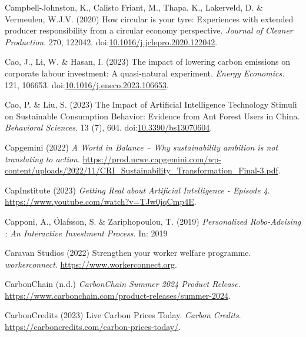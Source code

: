 \documentclass[
  letterpaper,
  DIV=11,
  numbers=noendperiod]{scrartcl}
\newlength{\cslhangindent}
\newenvironment{CSLReferences}[2] %
 {\begin{list}{}{%
  \setlength{\itemindent}{0pt}
  \setlength{\leftmargin}{0pt}
  \setlength{\parsep}{0pt}
  \ifodd #1
   \setlength{\leftmargin}{\cslhangindent}
   \setlength{\itemindent}{-1\cslhangindent}
  \fi
  \setlength{\itemsep}{#2\baselineskip}}}
 {\end{list}}
\begin{document}
\begin{CSLReferences}{0}{1}
Campbell-Johnston, K., Calisto Friant, M., Thapa, K., Lakerveld, D. \&
Vermeulen, W.J.V. (2020) How circular is your tyre: {Experiences} with
extended producer responsibility from a circular economy perspective.
\emph{Journal of Cleaner Production}. 270, 122042.
doi:\href{https://doi.org/10.1016/j.jclepro.2020.122042}{10.1016/j.jclepro.2020.122042}.

Cao, J., Li, W. \& Hasan, I. (2023) The impact of lowering carbon
emissions on corporate labour investment: {A} quasi-natural experiment.
\emph{Energy Economics}. 121, 106653.
doi:\href{https://doi.org/10.1016/j.eneco.2023.106653}{10.1016/j.eneco.2023.106653}.

Cao, P. \& Liu, S. (2023) The {Impact} of {Artificial Intelligence
Technology Stimuli} on {Sustainable Consumption Behavior}: {Evidence}
from {Ant Forest Users} in {China}. \emph{Behavioral Sciences}. 13 (7),
604. doi:\href{https://doi.org/10.3390/bs13070604}{10.3390/bs13070604}.

Capgemini (2022) \emph{A {World} in {Balance} -- {Why} sustainability
ambition is not translating to action}.
\url{https://prod.ucwe.capgemini.com/wp-content/uploads/2022/11/CRI_Sustainability_Transformation_Final-3.pdf}.

CapInstitute (2023) \emph{Getting {Real} about {Artificial Intelligence}
- {Episode} 4}. \url{https://www.youtube.com/watch?v=TJw0jqCmp4E}.

Capponi, A., Ólafsson, S. \& Zariphopoulou, T. (2019) \emph{Personalized
{Robo-Advising} : An {Interactive Investment Process}}. In: 2019

Caravan Studios (2022) Strengthen your worker welfare programme.
\emph{workerconnect}. \url{https://www.workerconnect.org}.

CarbonChain (n.d.) \emph{{CarbonChain Summer} 2024 {Product Release}}.
\url{https://www.carbonchain.com/product-releases/summer-2024}.

CarbonCredits (2023) Live {Carbon Prices Today}. \emph{Carbon Credits}.
\url{https://carboncredits.com/carbon-prices-today/}.


\end{CSLReferences}
\end{document}
